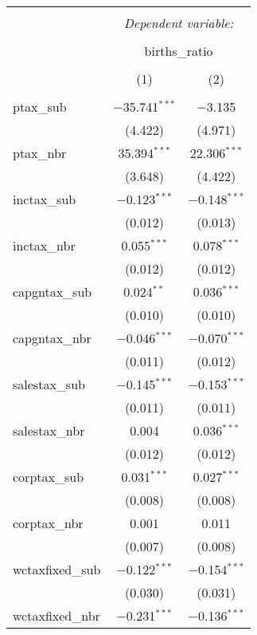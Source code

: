 
\begin{table}[!htbp] \centering 
  \caption{} 
  \label{} 
\begin{tabular}{@{\extracolsep{5pt}}lcc} 
\\[-1.8ex]\hline 
\hline \\[-1.8ex] 
 & \multicolumn{2}{c}{\textit{Dependent variable:}} \\ 
\cline{2-3} 
\\[-1.8ex] & \multicolumn{2}{c}{births\_ratio} \\ 
\\[-1.8ex] & (1) & (2)\\ 
\hline \\[-1.8ex] 
 ptax\_sub & $-$35.741$^{***}$ & $-$3.135 \\ 
  & (4.422) & (4.971) \\ 
  ptax\_nbr & 35.394$^{***}$ & 22.306$^{***}$ \\ 
  & (3.648) & (4.422) \\ 
  inctax\_sub & $-$0.123$^{***}$ & $-$0.148$^{***}$ \\ 
  & (0.012) & (0.013) \\ 
  inctax\_nbr & 0.055$^{***}$ & 0.078$^{***}$ \\ 
  & (0.012) & (0.012) \\ 
  capgntax\_sub & 0.024$^{**}$ & 0.036$^{***}$ \\ 
  & (0.010) & (0.010) \\ 
  capgntax\_nbr & $-$0.046$^{***}$ & $-$0.070$^{***}$ \\ 
  & (0.011) & (0.012) \\ 
  salestax\_sub & $-$0.145$^{***}$ & $-$0.153$^{***}$ \\ 
  & (0.011) & (0.011) \\ 
  salestax\_nbr & 0.004 & 0.036$^{***}$ \\ 
  & (0.012) & (0.012) \\ 
  corptax\_sub & 0.031$^{***}$ & 0.027$^{***}$ \\ 
  & (0.008) & (0.008) \\ 
  corptax\_nbr & 0.001 & 0.011 \\ 
  & (0.007) & (0.008) \\ 
  wctaxfixed\_sub & $-$0.122$^{***}$ & $-$0.154$^{***}$ \\ 
  & (0.030) & (0.031) \\ 
  wctaxfixed\_nbr & $-$0.231$^{***}$ & $-$0.136$^{***}$ \\ 

\end{tabular}
\end{table}
